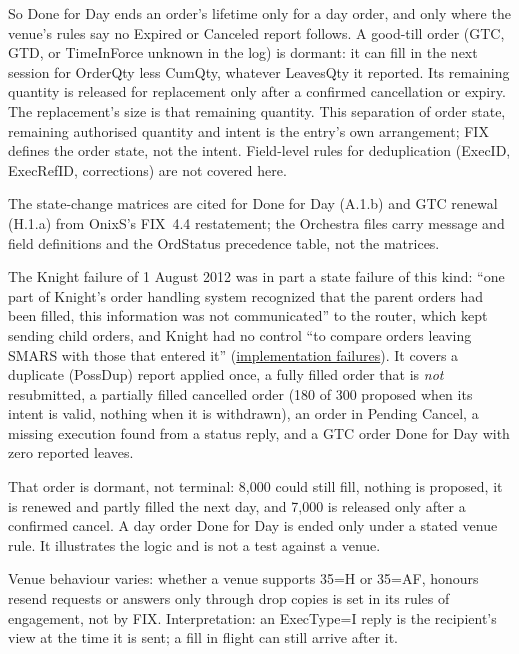 \begin{qfmechanism}
So Done for Day ends an order's lifetime only for a day order, and only where the venue's rules say no Expired or Canceled report follows. A good-till order (GTC, GTD, or TimeInForce unknown in the log) is dormant: it can fill in the next session for OrderQty less CumQty, whatever LeavesQty it reported. Its remaining quantity is released for replacement only after a confirmed cancellation or expiry. The replacement's size is that remaining quantity. This separation of order state, remaining authorised quantity and intent is the entry's own arrangement; FIX defines the order state, not the intent. Field-level rules for deduplication (ExecID, ExecRefID, corrections) are not covered here.

The state-change matrices are cited for Done for Day (A.1.b) and GTC renewal (H.1.a) from OnixS's FIX~4.4 restatement; the Orchestra files carry message and field definitions and the OrdStatus precedence table, not the matrices.

 The Knight failure of 1 August 2012 was in part a state failure of this kind: ``one part of Knight's order handling system recognized that the parent orders had been filled, this information was not communicated'' to the router, which kept sending child orders, and Knight had no control ``to compare orders leaving SMARS with those that entered it'' \citep[paras.~16 and~21, pp.~6--7]{wide-knight-capital} (\hyperref[ev:quant-implementation-failures]{implementation failures}). It covers a duplicate (PossDup) report applied once, a fully filled order that is \emph{not} resubmitted, a partially filled cancelled order (180 of 300 proposed when its intent is valid, nothing when it is withdrawn), an order in Pending Cancel, a missing execution found from a status reply, and a GTC order Done for Day with zero reported leaves.

That order is dormant, not terminal: 8{,}000 could still fill, nothing is proposed, it is renewed and partly filled the next day, and 7{,}000 is released only after a confirmed cancel. A day order Done for Day is ended only under a stated venue rule. It illustrates the logic and is not a test against a venue.

 Venue behaviour varies: whether a venue supports 35=H or 35=AF, honours resend requests or answers only through drop copies is set in its rules of engagement, not by FIX. Interpretation: an ExecType=I reply is the recipient's view at the time it is sent; a fill in flight can still arrive after it.


\end{qfmechanism}
